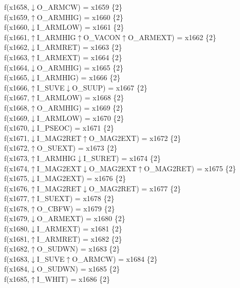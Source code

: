 f(x1658,$\downarrow$O\_ARMCW) = x1659 \{2\} \\  
f(x1659,$\uparrow$O\_ARMHIG) = x1660 \{2\} \\  
f(x1660,$\downarrow$I\_ARMLOW) = x1661 \{2\} \\  
f(x1661,$\uparrow$I\_ARMHIG$\uparrow$O\_VACON$\uparrow$O\_ARMEXT) = x1662 \{2\} \\  
f(x1662,$\downarrow$I\_ARMRET) = x1663 \{2\} \\  
f(x1663,$\uparrow$I\_ARMEXT) = x1664 \{2\} \\  
f(x1664,$\downarrow$O\_ARMHIG) = x1665 \{2\} \\  
f(x1665,$\downarrow$I\_ARMHIG) = x1666 \{2\} \\  
f(x1666,$\uparrow$I\_SUVE$\downarrow$O\_SUUP) = x1667 \{2\} \\  
f(x1667,$\uparrow$I\_ARMLOW) = x1668 \{2\} \\  
f(x1668,$\uparrow$O\_ARMHIG) = x1669 \{2\} \\  
f(x1669,$\downarrow$I\_ARMLOW) = x1670 \{2\} \\  
f(x1670,$\downarrow$I\_PSEOC) = x1671 \{2\} \\  
f(x1671,$\downarrow$I\_MAG2RET$\uparrow$O\_MAG2EXT) = x1672 \{2\} \\  
f(x1672,$\uparrow$O\_SUEXT) = x1673 \{2\} \\  
f(x1673,$\uparrow$I\_ARMHIG$\downarrow$I\_SURET) = x1674 \{2\} \\  
f(x1674,$\uparrow$I\_MAG2EXT$\downarrow$O\_MAG2EXT$\uparrow$O\_MAG2RET) = x1675 \{2\} \\  
f(x1675,$\downarrow$I\_MAG2EXT) = x1676 \{2\} \\  
f(x1676,$\uparrow$I\_MAG2RET$\downarrow$O\_MAG2RET) = x1677 \{2\} \\  
f(x1677,$\uparrow$I\_SUEXT) = x1678 \{2\} \\  
f(x1678,$\uparrow$O\_CBFW) = x1679 \{2\} \\  
f(x1679,$\downarrow$O\_ARMEXT) = x1680 \{2\} \\  
f(x1680,$\downarrow$I\_ARMEXT) = x1681 \{2\} \\  
f(x1681,$\uparrow$I\_ARMRET) = x1682 \{2\} \\  
f(x1682,$\uparrow$O\_SUDWN) = x1683 \{2\} \\  
f(x1683,$\downarrow$I\_SUVE$\uparrow$O\_ARMCW) = x1684 \{2\} \\  
f(x1684,$\downarrow$O\_SUDWN) = x1685 \{2\} \\  
f(x1685,$\uparrow$I\_WHIT) = x1686 \{2\} \\  
